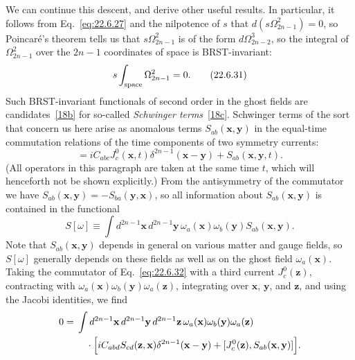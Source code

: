 We can continue this descent, and derive other useful results. In
particular, it follows from Eq.~\eqref{eq:22.6.27} and the nilpotence of
$s$ that $d(s\Omega^2_{2n-1})=0$, so Poincaré's theorem tells us that
$s\Omega^2_{2n-1}$ is of the form $d\Omega^3_{2n-2}$, so the integral of
$\Omega^2_{2n-1}$ over the $2n-1$ coordinates of space is BRST-invariant:
\begin{equation}
 s\int_{\rm space}\Omega^2_{2n-1}=0.
 \tag{22.6.31}\label{eq:22.6.31}
\end{equation}
Such BRST-invariant functionals of second order in the ghost fields are
candidates~\hyperref[ch22-ref-18b]{[18b]} for so-called
\emph{Schwinger terms}~\hyperref[ch22-ref-18c]{[18c]}. Schwinger terms of
the sort that concern us here arise as anomalous terms
$S_{ab}(\mathbf x,\mathbf y)$ in the equal-time commutation
relations of the time components of two symmetry currents:
\begin{equation}
 [J^0_a(\mathbf x,t),J^0_b(\mathbf y,t)]
 =iC_{abc}J^0_c(\mathbf x,t)
 \delta^{2n-1}(\mathbf x-\mathbf y)
 +S_{ab}(\mathbf x,\mathbf y,t).
 \tag{22.6.32}\label{eq:22.6.32}
\end{equation}
(All operators in this paragraph are taken at the same time $t$, which
will henceforth not be shown explicitly.) From the antisymmetry of the
commutator we have
$S_{ab}(\mathbf x,\mathbf y)
=-S_{ba}(\mathbf y,\mathbf x)$, so all information about
$S_{ab}(\mathbf x,\mathbf y)$ is contained in the functional
\begin{equation}
 S[\omega]\equiv\int d^{2n-1}\mathbf x\,d^{2n-1}\mathbf y\,
 \omega_a(\mathbf x)\omega_b(\mathbf y)
 S_{ab}(\mathbf x,\mathbf y).
 \tag{22.6.33}\label{eq:22.6.33}
\end{equation}
Note that $S_{ab}(\mathbf x,\mathbf y)$ depends in general on
various matter and gauge fields, so $S[\omega]$ generally depends on these
fields as well as on the ghost field $\omega_a(\mathbf x)$. Taking the
commutator of Eq.~\eqref{eq:22.6.32} with a third current
$J^0_c(\mathbf z)$, contracting with
$\omega_a(\mathbf x)\omega_b(\mathbf y)\omega_a(\mathbf z)$,
integrating over $\mathbf x$, $\mathbf y$, and $\mathbf z$, and using the
Jacobi identities, we find
\[
 \begin{aligned}
 0={}&\int d^{2n-1}\mathbf x\,d^{2n-1}\mathbf y\,
 d^{2n-1}\mathbf z\,
 \omega_a(\mathbf x)\omega_b(\mathbf y)
 \omega_a(\mathbf z)
 \\
 &\quad{}\cdot\Bigl[
 iC_{abd}
 S_{cd}(\mathbf z,\mathbf x)
 \delta^{2n-1}(\mathbf x-\mathbf y)
 +[J^0_c(\mathbf z),
 S_{ab}(\mathbf x,\mathbf y)]
 \Bigr].
 \end{aligned}
\]
